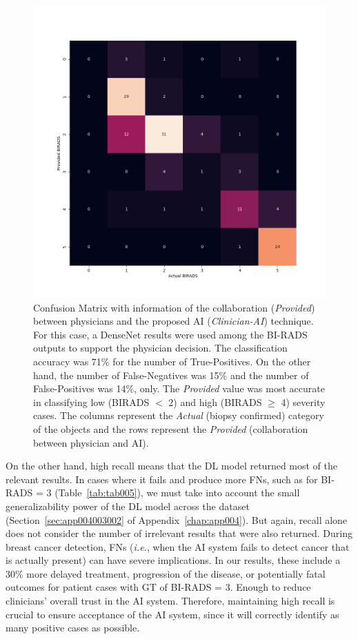 \begin{figure}[htbp]
\centering
\includegraphics[width=\textwidth]{images/fig043}
\caption{Confusion Matrix with information of the collaboration ({\it Provided}) between physicians and the proposed AI ({\it Clinician-AI}) technique. For this case, a DenseNet results were used among the BI-RADS outputs to support the physician decision. The classification accuracy was 71\% for the number of True-Positives. On the other hand, the number of False-Negatives was 15\% and the number of False-Positives was 14\%, only. The {\it Provided} value was most accurate in classifying low (BIRADS $<$ 2) and high (BIRADS $\ge$ 4) severity cases. The columns represent the {\it Actual} (biopsy confirmed) category of the objects and the rows represent the {\it Provided} (collaboration between physician and AI).}
\label{fig:fig043}
\end{figure}

On the other hand, high recall means that the \ac{DL} model returned most of the relevant results.
In cases where it fails and produce more \acp{FN}, such as for \ac{BI-RADS} = 3 (Table~\ref{tab:tab005}), we must take into account the small generalizability power of the \ac{DL} model across the dataset (Section~\ref{sec:app004003002} of Appendix~\ref{chap:app004}).
But again, recall alone does not consider the number of irrelevant results that were also returned.
During breast cancer detection, \acp{FN} ({\it i.e.}, when the \ac{AI} system fails to detect cancer that is actually present) can have severe implications.
In our results, these include a 30\% more delayed treatment, progression of the disease, or potentially fatal outcomes for patient cases with \ac{GT} of \ac{BI-RADS} = 3.
Enough to reduce clinicians' overall trust in the \ac{AI} system.
Therefore, maintaining high recall is crucial to ensure acceptance of the \ac{AI} system, since it will correctly identify as many positive cases as possible.

